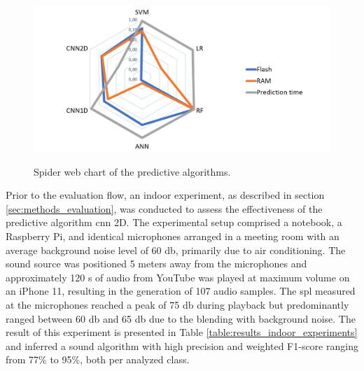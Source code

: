 \begin{figure}[htbp]
    \raggedright
        \caption{Spider web chart of the predictive algorithms.}
        \includegraphics[width=1\textwidth]{resources/images/060-results/Results_spider_chart_us8k_av_cnn2d.png}
        \label{fig:Results_spider_chart_us8k_av_cnn2d}
\end{figure}

Prior to the evaluation flow, an indoor experiment, as described in section \ref{sec:methods_evaluation}, was conducted to assess the effectiveness of the predictive algorithm \gls{cnn} 2D. The experimental setup comprised a notebook, a Raspberry Pi, and identical microphones arranged in a meeting room with an average background noise level of 60 \gls{db}, primarily due to air conditioning. The sound source was positioned 5 meters away from the microphones and approximately 120 \gls{s} of audio from YouTube was played at maximum volume on an iPhone 11, resulting in the generation of 107 audio samples. The \gls{spl} measured at the microphones reached a peak of 75 \gls{db} during playback but predominantly ranged between 60 \gls{db} and 65 \gls{db} due to the blending with background noise. The result of this experiment is presented in Table \ref{table:results_indoor_experiments} and inferred a sound algorithm with high precision and weighted F1-score ranging from 77\% to 95\%, both per analyzed class. 

